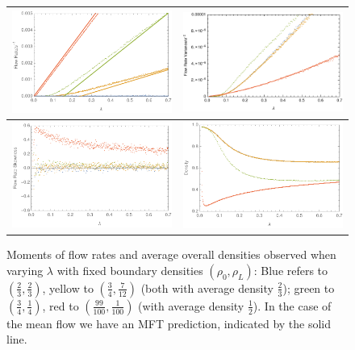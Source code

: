 \begin{figure}[h!]
\vspace{1em}
\caption{\label{fig:lambdaScans} Moments of flow rates and average overall densities observed when varying $\lambda$ with fixed boundary densities $(\rho_0, \rho_L)$: Blue refers to $(\frac{2}{3}, \frac{2}{3})$, yellow to $(\frac{3}{4}, \frac{7}{12})$
(both with average density $\frac{2}{3}$); green to $(\frac{3}{4}, \frac{1}{4})$, red to $(\frac{99}{100}, \frac{1}{100})$ (with average density $\frac{1}{2}$). In the case of the mean flow we have an MFT prediction, indicated by the solid line.}
\begin{center}
 \begin{tabular}{c|c}
    \includegraphics[width=0.5\linewidth]{../tex-src/images/lambdaScan/flowMean} & \includegraphics[width=0.5\linewidth]{../tex-src/images/lambdaScan/flowVar} \\
    \hline
    \includegraphics[width=0.5\linewidth]{../tex-src/images/lambdaScan/flowSkew} & \includegraphics[width=0.5\linewidth]{../tex-src/images/lambdaScan/lambdaDens} \\
    \end{tabular}
\end{center}
    \vspace{-0em}
\end{figure}

